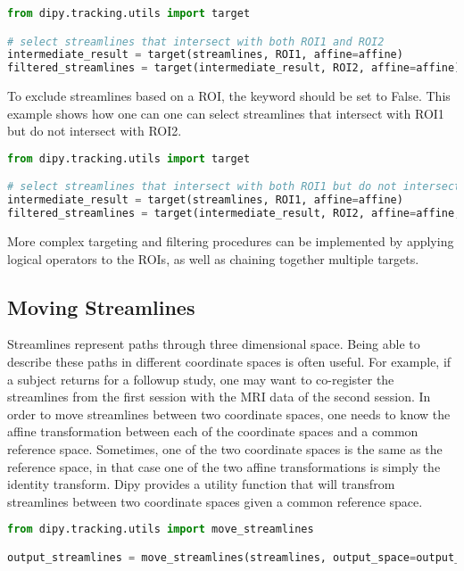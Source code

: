 \begin{lstlisting}[language=python]
from dipy.tracking.utils import target

# select streamlines that intersect with both ROI1 and ROI2
intermediate_result = target(streamlines, ROI1, affine=affine)
filtered_streamlines = target(intermediate_result, ROI2, affine=affine)

\end{lstlisting}

To exclude streamlines based on a ROI, the  keyword should be set to False. This example shows how one can one can select streamlines that intersect with ROI1 but do not intersect with ROI2.

\begin{lstlisting}[language=python]
from dipy.tracking.utils import target

# select streamlines that intersect with both ROI1 but do not intersect with ROI2
intermediate_result = target(streamlines, ROI1, affine=affine)
filtered_streamlines = target(intermediate_result, ROI2, affine=affine, include=False)

\end{lstlisting}

More complex targeting and filtering procedures can be implemented by applying logical operators to the ROIs, as well as chaining together multiple targets.

\subsection{Moving Streamlines}

Streamlines represent paths through three dimensional space. Being able to describe these paths in different coordinate spaces is often useful. For example, if a subject returns for a followup study, one may want to co-register the streamlines from the first session with the MRI data of the second session. In order to move streamlines between two coordinate spaces, one needs to know the affine transformation between each of the coordinate spaces and a common reference space. Sometimes, one of the two coordinate spaces is the same as the reference space, in that case one of the two affine transformations is simply the identity transform. Dipy provides a utility function that will transfrom streamlines between two coordinate spaces given a common reference space.

\begin{lstlisting}[language=python]
from dipy.tracking.utils import move_streamlines

output_streamlines = move_streamlines(streamlines, output_space=output_affine, input_space=input_affine)
\end{lstlisting}


